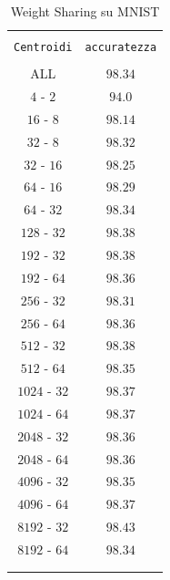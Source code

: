 \documentclass[11pt,a4paper,twoside,
openright]{book}
\begin{document}
\vspace*{\fill}
\begin{center}

\begin{table}[]
  \small
  \caption{Weight Sharing su MNIST}\label{tab:tabws}
\begin{center}
\begin{tabular}{cc}

\hline\\[-11pt]

\hline\\[-11pt]
\texttt{Centroidi} & \texttt{accuratezza} \\[1pt]
\hline\\[-6.5pt]
ALL & $98.34$ \\ 
$4$ - $2$ & $94.0$ \\ 
$16$ - $8$ & $98.14$ \\ 
$32$ - $8$ & $98.32$ \\ 
$32$ - $16$ & $98.25$ \\ 
$64$ - $16$ & $98.29$ \\ 
$64$ - $32$ & $98.34$ \\
$128$ - $32$ & $98.38$ \\ 
$192$ - $32$ & $98.38$ \\  
$192$ - $64$ & $98.36$ \\
$256$ - $32$ & $98.31$ \\ 
$256$ - $64$ & $98.36$ \\
$512$ - $32$ & $98.38$ \\  
$512$ - $64$ & $98.35$ \\
$1024$ - $32$ & $98.37$ \\  
$1024$ - $64$ & $98.37$ \\
$2048$ - $32$ & $98.36$ \\  
$2048$ - $64$ & $98.36$ \\ 
$4096$ - $32$ & $98.35$ \\ 
$4096$ - $64$ & $98.37$ \\
$8192$ - $32$ & $98.43$ \\
$8192$ - $64$ & $98.34$ \\  
\hline\\[-11pt]
\hline\\[-8pt]
\end{tabular}\\[5pt]
\end{center}
\normalsize
\end{table}
\end{center}
\end{document}
